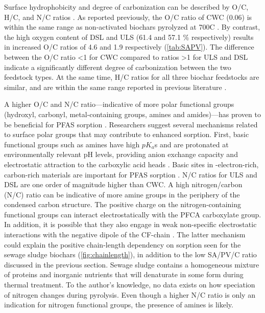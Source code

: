 Surface hydrophobicity and degree of carbonization can be described by O/C, H/C, and N/C ratios \citep{chun2004compositions}. As reported previously, the O/C ratio of CWC (0.06) is within the same range as non-activated biochars pyrolyzed at 700\textdegree C \citep{LehmannAndJoseph2015, chun2004compositions,kupryianchyk2016biochar}. By contrast, the high oxygen content of DSL and ULS (61.4 and 57.1 \% respectively) results in increased O/C ratios of 4.6 and 1.9 respectively (\cref{tab:SAPV}). The difference between the O/C ratio \textless 1 for CWC compared to ratios \textgreater 1 for ULS and DSL indicate a significantly different degree of carbonization between the two feedstock types. At the same time, H/C ratios for all three biochar feedstocks are similar, and are within the same range reported in previous literature \citep{chun2004compositions,kupryianchyk2016biochar}. 

A higher O/C and N/C ratio---indicative of more polar functional groups (hydroxyl, carbonyl, metal-containing groups, amines and amides)---has proven to be beneficial for PFAS sorption \citep{du2014adsorption,fabregat2022examining}. Researchers suggest several mechanisms related to surface polar groups that may contribute to enhanced sorption. First, basic functional groups such as amines have high $pK_a$s and are protonated at environmentally relevant pH levels, providing anion exchange capacity and electrostatic attraction to the carboxylic acid heads \citep{deng2010removal}. Basic sites in \textpi-electron-rich, carbon-rich materials are important for PFAS sorption \citep{saeidi2020understanding}. N/C ratios for ULS and DSL are one order of magnitude higher than CWC. A high nitrogen/carbon (N/C) ratio can be indicative of more amine groups in the periphery of the condensed carbon structure. The positive charge on the nitrogen-containing functional groups can interact electrostatically with the PFCA carboxylate group. In addition, it is possible that they also engage in weak non-specific electrostatic interactions with the negative dipole of the CF-chain \citep{xiao2011effects}. The latter mechanism could explain the positive chain-length dependency on sorption seen for the sewage sludge biochars (\cref{fig:chainlength}), in addition to the low SA/PV/C ratio discussed in the previous section. Sewage sludge contains a homogeneous mixture of proteins and inorganic nutrients that will denaturate in some form during thermal treatment. To the author's knowledge, no data exists on how speciation of nitrogen changes during pyrolysis. Even though a higher N/C ratio is only an indication for nitrogen functional groups, the presence of amines is likely.

